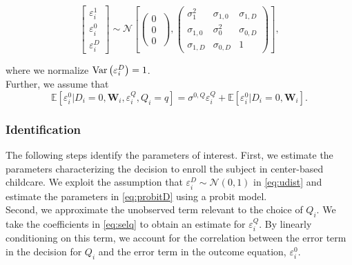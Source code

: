 \begin{appendices}
\begin{equation}
        \left[ \begin{array}{l}
        	 \varepsilon_{i}^1 \\
            \varepsilon_{i}^0 \\
            \varepsilon_{i}^D
        \end{array} \right]  \sim \mathcal{N} \left[ \left( \begin{array}{l}
        	 0 \\
           0 \\ 
           0
        \end{array} \ \right), 
                \left( \begin{array}{llll}
        	 \sigma_{1}^2 & \sigma_{1,0} & \sigma_{1,D}   \\
             \sigma_{1,0} & \sigma_{0}^2 & \sigma_{0,D}   \\
             \sigma_{1,D} & \sigma_{0,D} & 1 
        \end{array} \right) \right],  \label{eq:udist}
\end{equation}

\noindent where we normalize $\operatorname{Var} \left( \varepsilon^D_i \right) =1$.\\

\noindent Further, we assume that 
\begin{equation}
\mathbb{E}\left[\varepsilon_i^0|D_i=0,\mathbf{W}_i,\varepsilon^{Q}_i,Q_i=q\right]=\sigma^{0,Q}\varepsilon^{Q}_i+\mathbb{E}\left[\varepsilon_i^0|D_i=0,\mathbf{W}_i\right].
\label{eq:E[epsilon0]}
\end{equation}

\subsubsection{Identification}

\noindent The following steps identify the parameters of interest. First, we estimate the parameters characterizing the decision to enroll the subject in center-based childcare. We exploit the assumption that $\varepsilon_{i}^D \sim \mathcal{N} \left( 0, 1 \right)$ in \eqref{eq:udist} and estimate the parameters in \eqref{eq:probitD} using a probit model.\\

\noindent Second, we approximate the unobserved term relevant to the choice of $Q_{i}$. We take the coefficients in \eqref{eq:selq} to obtain an estimate for $\varepsilon^{Q}_i$. By linearly conditioning on this term, we account for the correlation between the error term in the decision for $Q_{i}$ and the error term in the outcome equation, $\varepsilon_i^0$.\\


\end{appendices}
